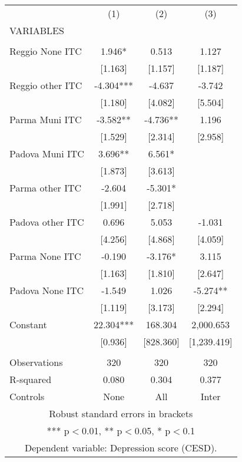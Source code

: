 \begin{tabular}{lccc} \hline
 & (1) & (2) & (3) \\
VARIABLES &  &  &  \\ \hline
 &  &  &  \\
Reggio None ITC & 1.946* & 0.513 & 1.127 \\
 & [1.163] & [1.157] & [1.187] \\
Reggio other ITC & -4.304*** & -4.637 & -3.742 \\
 & [1.180] & [4.082] & [5.504] \\
Parma Muni ITC & -3.582** & -4.736** & 1.196 \\
 & [1.529] & [2.314] & [2.958] \\
Padova Muni ITC & 3.696** & 6.561* &  \\
 & [1.873] & [3.613] &  \\
Parma other ITC & -2.604 & -5.301* &  \\
 & [1.991] & [2.718] &  \\
Padova other ITC & 0.696 & 5.053 & -1.031 \\
 & [4.256] & [4.868] & [4.059] \\
Parma None ITC & -0.190 & -3.176* & 3.115 \\
 & [1.163] & [1.810] & [2.647] \\
Padova None ITC & -1.549 & 1.026 & -5.274** \\
 & [1.119] & [3.173] & [2.294] \\
Constant & 22.304*** & 168.304 & 2,000.653 \\
 & [0.936] & [828.360] & [1,239.419] \\
 &  &  &  \\
Observations & 320 & 320 & 320 \\
R-squared & 0.080 & 0.304 & 0.377 \\
 Controls & None & All & Inter \\ \hline
\multicolumn{4}{c}{ Robust standard errors in brackets} \\
\multicolumn{4}{c}{ *** p$<$0.01, ** p$<$0.05, * p$<$0.1} \\
\multicolumn{4}{c}{ Dependent variable: Depression score (CESD).} \\
\end{tabular}

